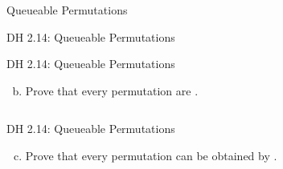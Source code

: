 \begin{frame}{}
  \centerline{\LARGE Queueable Permutations}

  \vspace{0.30cm}
\end{frame}

\begin{frame}{}
  \begin{exampleblock}{DH 2.14: Queueable Permutations}

  \end{exampleblock}
\end{frame}

\begin{frame}{}
  \begin{exampleblock}{DH 2.14: Queueable Permutations}
    \begin{enumerate}[(a)]
      \setcounter{enumi}{1}
      \item Prove that every permutation are .
    \end{enumerate}
  \end{exampleblock}

  \begin{columns}
      \pause
      
  \end{columns}
\end{frame}

\begin{frame}{}
  \begin{exampleblock}{DH 2.14: Queueable Permutations}
    \begin{enumerate}[(a)]
      \setcounter{enumi}{2}
      \item Prove that every permutation can be obtained by .
    \end{enumerate}
  \end{exampleblock}

  \begin{columns}
      \pause
      
  \end{columns}
\end{frame}

